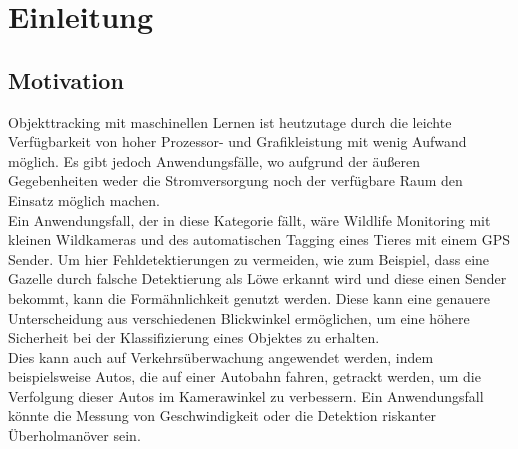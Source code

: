 \chapter{Einleitung}
\label{ch:intro}


\section{Motivation}{ 

	Objekttracking mit maschinellen Lernen ist heutzutage durch die leichte Verfügbarkeit von hoher Prozessor- und Grafikleistung mit wenig Aufwand möglich. Es gibt jedoch Anwendungsfälle, wo aufgrund der äußeren Gegebenheiten weder die Stromversorgung noch der verfügbare Raum den Einsatz möglich machen. \\
	Ein Anwendungsfall, der in diese Kategorie fällt, wäre Wildlife Monitoring mit kleinen Wildkameras und des automatischen Tagging eines Tieres mit einem GPS Sender. Um hier Fehldetektierungen zu vermeiden, wie zum Beispiel, dass eine Gazelle durch falsche Detektierung als Löwe erkannt wird und diese einen Sender bekommt, kann die Formähnlichkeit genutzt werden. Diese kann eine genauere Unterscheidung aus verschiedenen Blickwinkel ermöglichen, um eine höhere Sicherheit bei der Klassifizierung eines Objektes zu erhalten. \\
	Dies kann auch auf Verkehrsüberwachung angewendet werden, indem beispielsweise Autos, die auf einer Autobahn fahren, getrackt werden, um die Verfolgung dieser Autos im Kamerawinkel zu verbessern. Ein Anwendungsfall könnte die Messung von Geschwindigkeit oder die Detektion riskanter Überholmanöver sein.
}

